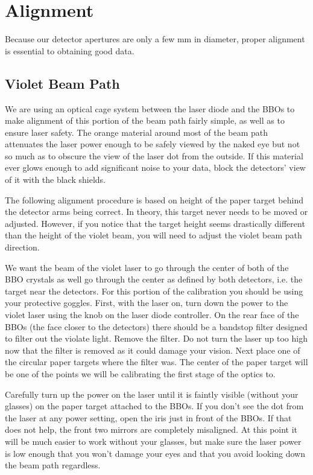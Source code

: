 \documentclass{../lab}
\begin{document}
\section{Alignment}
\label{sec:Alignment}

Because our detector apertures are only a few mm in diameter, proper alignment is essential to obtaining good data.

\subsection{Violet Beam Path}

We are using an optical cage system between the laser diode and the BBOs to make alignment of this portion of the beam path fairly simple, as well as to ensure laser safety. The orange material around most of the beam path attenuates the laser power enough to be safely viewed by the naked eye but not so much as to obscure the view of the laser dot from the outside. If this material ever glows enough to add significant noise to your data, block the detectors' view of it with the black shields.

The following alignment procedure is based on height of the paper target behind the detector arms being correct. In theory, this target never needs to be moved or adjusted. However, if you notice that the target height seems drastically different than the height of the violet beam, you will need to adjust the violet beam path direction.

We want the beam of the violet laser to go through the center of both of the BBO crystals as well go through the center as defined by both detectors, i.e. the target near the detectors. For this portion of the calibration you should be using your protective goggles. First, with the laser on, turn down the power to the violet laser using the knob on the laser diode controller. On the rear face of the BBOs (the face closer to the detectors) there should be a bandstop filter designed to filter out the violate light. Remove the filter. Do not turn the laser up too high now that the filter is removed as it could damage your vision. Next place one of the circular paper targets where the filter was. The center of the paper target will be one of the points we will be calibrating the first stage of the optics to.

Carefully turn up the power on the laser until it is faintly visible (without your glasses) on the paper target attached to the BBOs. If you don't see the dot from the laser at any power setting, open the iris just in front of the BBOs. If that does not help, the front two mirrors are completely misaligned. At this point it will be much easier to work without your glasses, but make sure the laser power is low enough that you won't damage your eyes and that you avoid looking down the beam path regardless.
\end{document}
